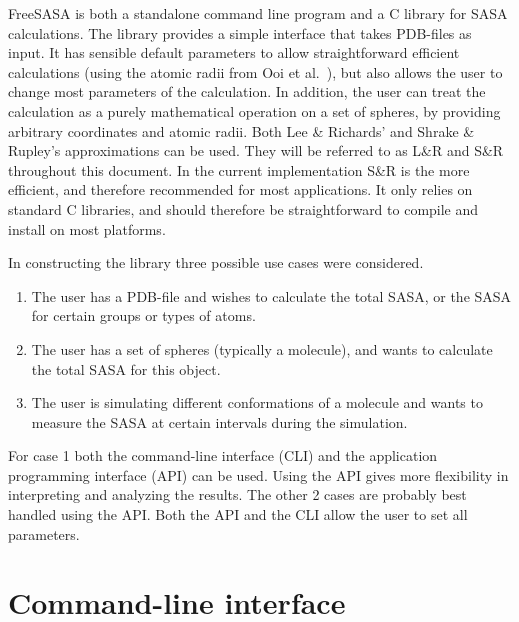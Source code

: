\documentclass[a4paper,11pt]{article}
\begin{document}
FreeSASA is both a standalone command line program and a C library for
SASA calculations. The library provides a simple interface that takes
PDB-files as input. It has sensible default parameters to allow
straightforward efficient calculations (using the atomic radii from
Ooi et al.~\cite{OONS}), but also allows the user to change most
parameters of the calculation. In addition, the user can treat the
calculation as a purely mathematical operation on a set of spheres, by
providing arbitrary coordinates and atomic radii. Both Lee \&
Richards' \cite{LnR} and Shrake \& Rupley's \cite{SnR} approximations
can be used. They will be referred to as L\&R and S\&R throughout this
document. In the current implementation S\&R is the more efficient,
and therefore recommended for most applications. It only relies on
standard C libraries, and should therefore be straightforward to
compile and install on most platforms.

In constructing the library three possible use cases were considered. 
\begin{enumerate}
\item The user has a PDB-file and wishes to calculate the total SASA, 
  or the SASA for certain groups or types of atoms.
\item The user has a set of spheres (typically a molecule), and wants
  to calculate the total SASA for this object.
\item The user is simulating different conformations of a molecule and
  wants to measure the SASA at certain intervals during the simulation.
\end{enumerate}
For case 1 both the command-line interface (CLI) and the application
programming interface (API) can be used. Using the API gives more
flexibility in interpreting and analyzing the results. The other 2
cases are probably best handled using the API. Both the API and the
CLI allow the user to set all parameters.


\section{Command-line interface}\label{sec:cli}
\end{document}
